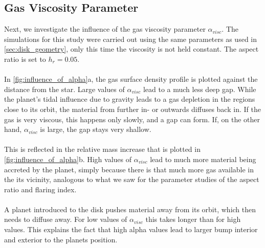 %

    \clearpage
    \subsection{Gas Viscosity Parameter}
      Next, we investigate the influence of the gas viscosity parameter 
      $\alpha_{visc}$. The simulations for this study were carried out using 
      the same parameters as used in \autoref{sec:disk_geometry}, only this 
      time the viscosity is not held constant. The aspect ratio is set to 
      $h_r=0.05$. 
      \\
      \\
      In \autoref{fig:influence_of_alpha}a, the gas 
      surface density profile is plotted against the distance from the star.
      Large values of $\alpha_{visc}$ lead to a much less deep gap. While the 
      planet's tidal influence due to gravity leads to a gas depletion in the 
      regions close to its orbit, the material from further in- or outwards 
      diffuses back in. If the gas is very viscous, this happens only slowly,
      and a gap can form. If, on the other hand, $\alpha_{visc}$ is large,
      the gap stays very shallow. \\
      \\
      This is reflected in the relative mass 
      increase that is plotted in \autoref{fig:influence_of_alpha}b. 
      High values of $\alpha_{visc}$ lead to much more material being accreted 
      by the planet, simply because there is that much more gas available 
      in the its vicinity, analogous to what we saw for the parameter 
      studies of the aspect ratio and flaring index. \\
      \\
      A planet introduced to the disk pushes material away from its orbit,
      which then needs to diffuse away. For low values of 
      $\alpha_{visc}$ this takes longer than for high values. This explains the 
      fact that high alpha values lead to larger bump interior and exterior to 
      the planets position.
      \\
      \\
